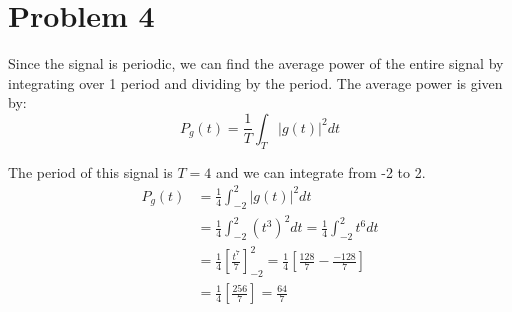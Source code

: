 \documentclass{article}
\begin{document}
\section{Problem 4}
Since the signal is periodic, we can find the average power of the entire signal by integrating over 1 period and dividing by the period. The average power is given by:
\[
    P_g(t) = \frac{1}{T} \int_{T} |g(t)|^2 dt
\]

The period of this signal is $T = 4$ and we can integrate from -2 to 2.
\begin{align*}
    P_g(t) &= \frac{1}{4} \int_{-2}^{2} |g(t)|^2 dt \\
    &= \frac{1}{4} \int_{-2}^{2} (t^3)^2 dt = \frac{1}{4} \int_{-2}^{2} t^6 dt \\
    &= \frac{1}{4} \left[\frac{t^7}{7}\right]_{-2}^{2} = \frac{1}{4} \left[\frac{128}{7} - \frac{-128}{7}\right] \\
    &= \frac{1}{4} \left[\frac{256}{7}\right] = \boxed{\frac{64}{7}} \\
\end{align*}
\end{document}
